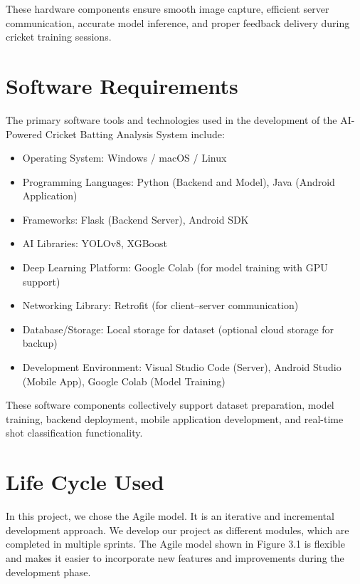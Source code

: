 These hardware components ensure smooth image capture, efficient server communication, accurate model inference, and proper feedback delivery during cricket training sessions.
\section{Software Requirements}  \label{S3.5}
The primary software tools and technologies used in the development of the AI-Powered Cricket Batting Analysis System include:

\begin{itemize}
	\item Operating System: Windows / macOS / Linux
	\item Programming Languages: Python (Backend and Model), Java (Android Application)
	\item Frameworks: Flask (Backend Server), Android SDK
	\item AI Libraries: YOLOv8, XGBoost
	\item Deep Learning Platform: Google Colab (for model training with GPU support)
	\item Networking Library: Retrofit (for client–server communication)
	\item Database/Storage: Local storage for dataset (optional cloud storage for backup)
	\item Development Environment: Visual Studio Code (Server), Android Studio (Mobile App), Google Colab (Model Training)
\end{itemize}

These software components collectively support dataset preparation, model training, backend deployment, mobile application development, and real-time shot classification functionality.
\section{Life Cycle Used}  \label{S3.6}
In this project, we chose the Agile model. It is an iterative and incremental development 
approach. We develop our project as different modules, which are completed in multiple 
sprints. The Agile model shown in Figure 3.1 is flexible and makes it easier to incorporate new features and improvements during the development phase.

